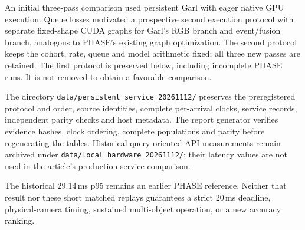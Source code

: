 An initial three-pass comparison used persistent Garl with eager native GPU execution. Queue losses motivated a prospective second execution protocol with separate fixed-shape CUDA graphs for Garl's RGB branch and event/fusion branch, analogous to PHASE's existing graph optimization. The second protocol keeps the cohort, rate, queue and model arithmetic fixed; all three new passes are retained. The first protocol is preserved below, including incomplete PHASE runs. It is not removed to obtain a favorable comparison.

\begin{table}[H]
\centering\small
\caption{\textbf{Earlier eager-Garl protocol, all outcomes.} Complete p95 (ms) is shown only for a fully covered replay. PHASE uses its original optimized service in both protocols.}

\end{table}

The directory \texttt{data/persistent\_service\_20261112/} preserves the preregistered protocol and order, source identities, complete per-arrival clocks, service records, independent parity checks and host metadata. The report generator verifies evidence hashes, clock ordering, complete populations and parity before regenerating the tables. Historical query-oriented API measurements remain archived under \texttt{data/local\_hardware\_20261112/}; their latency values are not used in the article's production-service comparison.

The historical 29.14\,ms p95 remains an earlier PHASE reference. Neither that result nor these short matched replays guarantees a strict 20\,ms deadline, physical-camera timing, sustained multi-object operation, or a new accuracy ranking.
